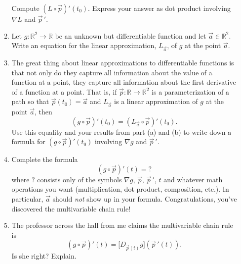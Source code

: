 \documentclass[letter]{article}
\newcommand{\R}{\mathbb{R}}
\begin{document}
\begin{enumerate}
\begin{enumerate}
					Compute $(L\circ \vec p)'(t_0)$.  Express your answer as dot product
					involving $\nabla L$ and $\vec p\,'$.
				\item Let $g:\R^2\to\R$ be an unknown but differentiable function and let $\vec a\in\R^2$.
					Write an equation for the linear approximation, $L_{\vec a}$, of $g$ at the point $\vec a$.
				\item The great thing about linear approximations to differentiable functions 
					is that not only do they capture all
					information about the value of a function at a point, they capture all information
					about the first derivative of a function at a point.  That is, if
					$\vec p:\R\to\R^2$ is a parameterization of a path so that $\vec p(t_0)=\vec a$
					and $L_{\vec a}$ is a linear approximation of $g$ at the point $\vec a$, then
					\[
						(g\circ \vec p)'(t_0) = (L_{\vec a}\circ \vec p)'(t_0).
					\]
					Use this equality and your results from part (a) and (b) to write down a formula
					for $(g\circ \vec p)'(t_0)$ involving $\nabla g$ and $\vec p\,'$.
				\item Complete the formula
					\[
						(g\circ \vec p)'(t) = ?
					\]
					where $?$ consists only of the symbols $\nabla g$, $\vec p$, $\vec p\,'$, $t$ and whatever
					math operations you want (multiplication, dot product, composition, etc.).  In particular,
					$\vec a$ should \emph{not} show up in your formula.  Congratulations,
					you've discovered the multivariable chain rule!
				\item The professor across the hall from me claims the multivariable chain rule is
					\[
						(g\circ \vec p)'(t) = \Big[D_{\vec p(t)}g\Big](\vec p\,'(t)).
					\]
					Is she right? Explain.
			\end{enumerate}

\end{enumerate}
\end{document}
